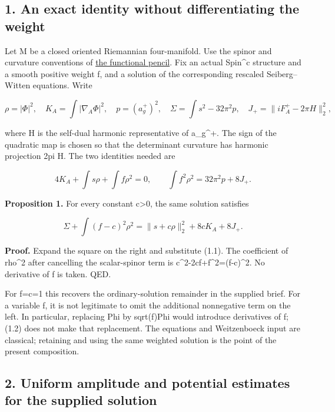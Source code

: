 \documentclass[
  10pt,
]{article}
\begin{document}
\hypertarget{an-exact-identity-without-differentiating-the-weight}{%
\subsection{1. An exact identity without differentiating the
weight}\label{an-exact-identity-without-differentiating-the-weight}}

Let M be a closed oriented Riemannian four-manifold. Use the spinor and
curvature conventions of
\href{../mathematics/current/line1_functional_pencil.md}{the functional
pencil}. Fix an actual Spin\^{}c structure and a smooth positive weight
f, and a solution of the corresponding rescaled Seiberg--Witten
equations. Write

\[
 \rho=|\Phi|^2,\quad K_A=\int|\nabla_A\Phi|^2,\quad
 p=(a_g^+)^2,\quad \Sigma=\int s^2-32\pi^2p,
 \quad J_+=\|iF_A^+-2\pi H\|_2^2,
\]

where H is the self-dual harmonic representative of a\_g\^{}+. The sign
of the quadratic map is chosen so that the determinant curvature has
harmonic projection 2pi H. The two identities needed are

\[
 4K_A+\int s\rho+\int f\rho^2=0,\qquad
 \int f^2\rho^2=32\pi^2p+8J_+.                 \tag{1.1}
\]

\textbf{Proposition 1.} For every constant c\textgreater0, the same
solution satisfies

\[
 \boxed{\Sigma+\int(f-c)^2\rho^2
 =\|s+c\rho\|_2^2+8cK_A+8J_+.}              \tag{1.2}
\]

\textbf{Proof.} Expand the square on the right and substitute (1.1). The
coefficient of rho\^{}2 after cancelling the scalar-spinor term is
c\^{}2-2cf+f\^{}2=(f-c)\^{}2. No derivative of f is taken. QED.

For f=c=1 this recovers the ordinary-solution remainder in the supplied
brief. For a variable f, it is not legitimate to omit the additional
nonnegative term on the left. In particular, replacing Phi by sqrt(f)Phi
would introduce derivatives of f; (1.2) does not make that replacement.
The equations and Weitzenboeck input are classical; retaining and using
the same weighted solution is the point of the present composition.

\hypertarget{uniform-amplitude-and-potential-estimates-for-the-supplied-solution}{%
\subsection{2. Uniform amplitude and potential estimates for the
supplied
solution}\label{uniform-amplitude-and-potential-estimates-for-the-supplied-solution}}
\end{document}
